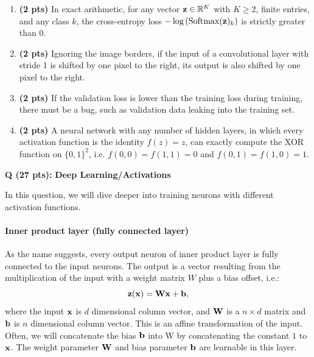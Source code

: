 \documentclass[11pt]{exam}
\newcounter{questionno}
\newcommand{\question}[1]{
\noindent
\newline
\stepcounter{questionno}
\setcounter{partno}{0}
{\bf \large Q\arabic{questionno} (#1 pts): }
}
\begin{document}
\begin{enumerate}[1.]
\item {\bf (2 pts)} In exact arithmetic, for any vector ${\bf z} \in \mathbb{R}^K$ with $K \geq 2$, finite entries, and any class $k$, the cross-entropy loss $-\log\left(\text{Softmax}({\bf z})_k\right)$ is strictly greater than 0.
\begin{tcolorbox}
\vspace{20ex}
\end{tcolorbox}

\item {\bf (2 pts)} Ignoring the image borders, if the input of a convolutional layer with stride 1 is shifted by one pixel to the right, its output is also shifted by one pixel to the right.
\begin{tcolorbox}
\vspace{20ex}
\end{tcolorbox}

\item {\bf (2 pts)} If the validation loss is lower than the training loss during training, there must be a bug, such as validation data leaking into the training set.
\begin{tcolorbox}
\vspace{20ex}
\end{tcolorbox}

\clearpage

\item {\bf (2 pts)} A neural network with any number of hidden layers, in which every activation function is the identity $f(z) = z$, can exactly compute the XOR function on $\{0, 1\}^2$, i.e. $f(0,0) = f(1,1) = 0$ and $f(0,1) = f(1,0) = 1$.
\begin{tcolorbox}
\vspace{20ex}
\end{tcolorbox}

\end{enumerate}


\newpage
\question{27} {\bf \large Deep Learning/Activations}

In this question, we will dive deeper into training neurons with different activation functions.

\paragraph{Inner product layer (fully connected layer)}
As the name suggests, every output neuron of inner product layer is fully connected to the input neurons. 
The output is a vector resulting from the multiplication of the input with a weight matrix $W$
plus a bias offset, i.e.:
\begin{equation}
{\bf z}({\bf x}) = {\bf W x} + {\bf b},
\end{equation}
where the input ${\bf x}$ is $d$ dimensional column vector, and ${\bf W}$ is a $n\times d$ matrix and ${\bf b}$ is $n$ dimensional column vector.
This is an affine transformation of the input.
Often, we will concatenate the bias ${\bf b}$ into W by concatenating the constant $1$ to ${\bf x}$.
The weight parameter ${\bf W}$
and bias parameter ${\bf b}$ are learnable in this layer. 
\end{document}
